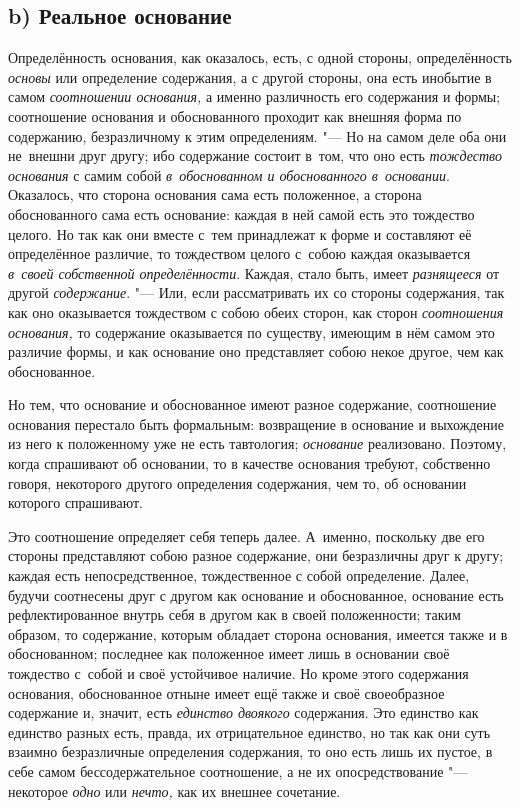 \subsection[b) Реальное основание]{b) Реальное основание}

Определённость основания, как оказалось, есть, с одной стороны, определённость
{\em основы} или определение содержания, а с другой стороны, она есть инобытие
в самом {\em соотношении основания,} а именно различность его содержания и
формы; соотношение основания и обоснованного проходит как внешняя форма по
содержанию, безразличному к этим определениям. "--- Но на самом
деле оба они не~внешни друг другу; ибо содержание состоит
в~том, что оно есть {\em тождество основания} с самим собой
{\em в~обоснованном и обоснованного в~основании}. Оказалось, что сторона
основания сама есть положенное, а сторона обоснованного сама есть основание:
каждая в ней самой есть это тождество целого. Но так как они вместе с~тем
принадлежат к форме и составляют её определённое различие, то тождеством целого
с~собою каждая оказывается {\em в~своей собственной
определённости}. Каждая, стало быть,
имеет {\em разнящееся} от другой {\em содержание}. "--- Или, если рассматривать
их со стороны содержания, так как оно оказывается тождеством с собою обеих
сторон, как сторон {\em соотношения основания,} то содержание оказывается по
существу, имеющим в нём самом это различие формы, и как основание оно
представляет собою некое другое, чем как обоснованное.

Но тем, что основание и обоснованное имеют разное содержание, соотношение
основания перестало быть формальным: возвращение в основание и выхождение из
него к положенному уже не есть тавтология; {\em основание} реализовано.
Поэтому, когда спрашивают об основании, то в качестве основания требуют,
собственно говоря, некоторого другого определения содержания, чем то, об
основании которого спрашивают.

Это соотношение определяет себя теперь далее. А~именно, поскольку две его
стороны представляют собою разное содержание, они безразличны друг к другу;
каждая есть непосредственное, тождественное с собой определение. Далее, будучи
соотнесены друг с другом как основание и обоснованное, основание есть
рефлектированное внутрь себя в другом как в своей положенности; таким образом,
то содержание, которым обладает сторона основания, имеется также и в
обоснованном; последнее как положенное имеет лишь в основании своё тождество
с~собой и своё устойчивое наличие. Но кроме этого содержания основания,
обоснованное отныне имеет ещё также и своё своеобразное содержание и, значит,
есть {\em единство двоякого} содержания. Это единство как единство разных есть,
правда, их отрицательное единство, но так как они суть взаимно безразличные
определения содержания, то оно есть лишь их пустое, в себе самом
бессодержательное соотношение, а не их опосредствование "--- некоторое
{\em одно} или {\em нечто,} как их внешнее сочетание.


